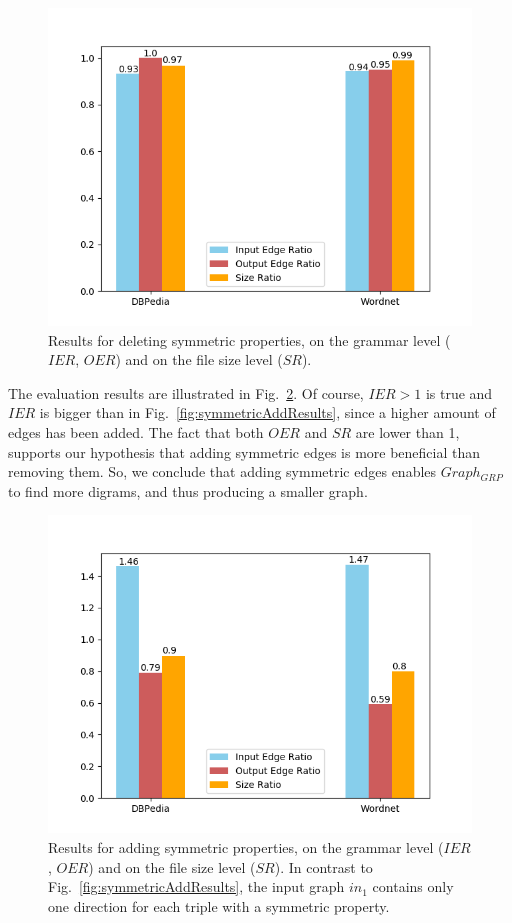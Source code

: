 \begin{figure}
	\centering
	\includegraphics[width=0.8\linewidth]{figures/4_evaluation/ontology/ratiosSymmetricsDelete}
	\caption{Results for deleting symmetric properties, on the grammar level ($IER$, $OER$) and on the file size level ($SR$).}
	\label{fig:symmetricDeleteResults}
\end{figure}



The evaluation results are illustrated in Fig.~\ref{fig:symmetricAddResults2}. Of course, $IER>1$ is true and $IER$ is bigger than in Fig.~\ref{fig:symmetricAddResults}, since a higher amount of edges has been added. The fact that both $OER$ and $SR$ are lower than 1, supports our hypothesis that adding symmetric edges is more beneficial than removing them. So, we conclude that adding symmetric edges enables $Graph_{GRP}$ to find more digrams, and thus producing a smaller graph.

\begin{figure}
	\centering
	\includegraphics[width=0.8\linewidth]{figures/4_evaluation/ontology/ratiosSymmetricsAdd2}
	\caption{Results for adding symmetric properties, on the grammar level ($IER$, $OER$) and on the file size level ($SR$). In contrast to Fig.~\ref{fig:symmetricAddResults}, the input graph $in_1$ contains only one direction for each triple with a symmetric property.}
	\label{fig:symmetricAddResults2}
\end{figure}



